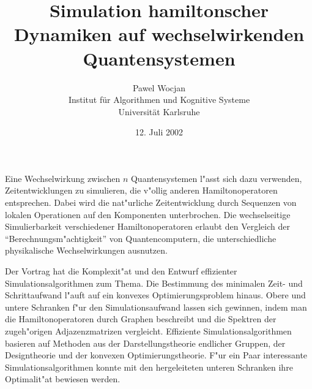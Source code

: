 \documentclass{article}[12pt]
\title{Simulation hamiltonscher Dynamiken auf wechselwirkenden
Quantensystemen}
\author{Pawel Wocjan\\Institut f\"ur Algorithmen und Kognitive Systeme\\
Universit\"at Karlsruhe}
\date{12. Juli 2002}
\begin{document}
\maketitle 

Eine Wechselwirkung zwischen $n$ Quantensystemen l"asst sich dazu
verwenden, Zeitentwicklungen zu simulieren, die v"ollig anderen
Hamiltonoperatoren entsprechen. Dabei wird die nat"urliche
Zeitentwicklung durch Sequenzen von lokalen Operationen auf den
Komponenten unterbrochen. Die wechselseitige Simulierbarkeit
verschiedener Hamiltonoperatoren erlaubt den Vergleich der
"`Berechnungsm"achtigkeit"' von Quantencomputern, die unterschiedliche
physikalische Wechselwirkungen ausnutzen.

Der Vortrag hat die Komplexit"at und den Entwurf effizienter
Simulationsalgorithmen zum Thema. Die Bestimmung des minimalen Zeit-
und Schrittaufwand l"auft auf ein konvexes Optimierungsproblem
hinaus. Obere und untere Schranken f"ur den Simulationsaufwand lassen
sich gewinnen, indem man die Hamiltonoperatoren durch Graphen
beschreibt und die Spektren der zugeh"origen Adjazenzmatrizen
vergleicht. Effiziente Simulationsalgorithmen basieren auf Methoden
aus der Darstellungstheorie endlicher Gruppen, der Designtheorie und
der konvexen Optimierungs\-theorie. F"ur ein Paar interessante
Simulationsalgorithmen konnte mit den hergeleiteten unteren Schranken
ihre Optimalit"at bewiesen werden.
\end{document}

